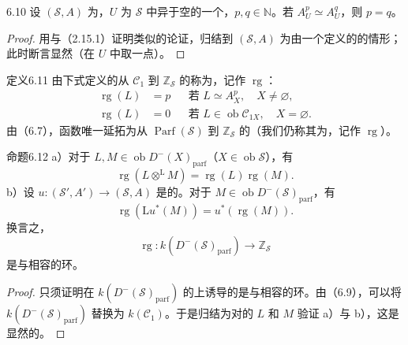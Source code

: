 \begin{SGAresult}{}{6.10}
设 $(\mathscr S,A)$ 为，$U$ 为 $\mathscr S$ 中异于空的一个，$p,q\in\mathbb N$。若 $A_U^p\simeq A_U^q$，则 $p=q$。
\end{SGAresult}
\begin{proof}
用与（2.15.1）证明类似的论证，归结到 $(\mathscr S,A)$ 为由一个定义的的情形；此时断言显然（在 $U$ 中取一点）。
\end{proof}

\begin{SGAresult}{定义}{6.11}
由下式定义的从 $\mathcal C_1$ 到 $\mathbb Z_{\mathscr S}$ 的称为，记作 $\operatorname{rg}$：
\[\begin{aligned}
\operatorname{rg}(L)&=p&&\text{若 }L\simeq A_X^p,\quad X\ne\varnothing,\\
\operatorname{rg}(L)&=0&&\text{若 }L\in\operatorname{ob}\mathcal C_{1X},\quad X=\varnothing.
\end{aligned}\]
由（6.7），函数唯一延拓为从 $\operatorname{Parf}(\mathscr S)$ 到 $\mathbb Z_{\mathscr S}$ 的（我们仍称其为，记作 $\operatorname{rg}$）。
\end{SGAresult}

\begin{SGAresult}{命题}{6.12}
a）对于 $L,M\in\operatorname{ob}D^-(X)_{\mathrm{parf}}$（$X\in\operatorname{ob}\mathscr S$），有
\[\operatorname{rg}(L\otimes^{\mathrm L}M)=\operatorname{rg}(L)\operatorname{rg}(M).\]
b）设 $u:(\mathscr S',A')\to(\mathscr S,A)$ 是的。对于 $M\in\operatorname{ob}D^-(\mathscr S)_{\mathrm{parf}}$，有
\[\operatorname{rg}(\mathrm Lu^*(M))=u^*(\operatorname{rg}(M)).\]
换言之，
\[\operatorname{rg}:k(D^-(\mathscr S)_{\mathrm{parf}})\longrightarrow\mathbb Z_{\mathscr S}\]
是与相容的环。
\end{SGAresult}
\begin{proof}
只须证明在 $k(D^-(\mathscr S)_{\mathrm{parf}})$ 的上诱导的是与相容的环。由（6.9），可以将 $k(D^-(\mathscr S)_{\mathrm{parf}})$ 替换为 $k(\mathcal C_1)$。于是归结为对的 $L$ 和 $M$ 验证 a）与 b），这是显然的。
\end{proof}

